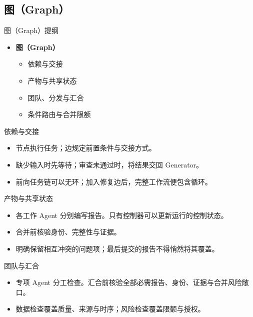 \subsection{图（Graph）}
\begin{frame}{图（Graph）提纲}
\begin{itemize}
\item \textbf{图（Graph）}
\begin{itemize}
\item 依赖与交接
\item 产物与共享状态
\item 团队、分发与汇合
\item 条件路由与合并限额
\end{itemize}
\end{itemize}
\end{frame}
\begin{frame}{依赖与交接}
\begin{center}
\resizebox{.94\textwidth}{!}{}
\end{center}
\begin{itemize}
\item 节点执行任务；边规定前置条件与交接方式。
\item 缺少输入时先等待；审查未通过时，将结果交回 Generator。
\item 前向任务链可以无环；加入修复边后，完整工作流便包含循环。
\end{itemize}
\end{frame}
\begin{frame}{产物与共享状态}
\begin{center}
\resizebox{.96\textwidth}{!}{}
\end{center}
\begin{itemize}
\item 各工作 Agent 分别编写报告。只有控制器可以更新运行的控制状态。
\item 合并前核验身份、完整性与证据。
\item 明确保留相互冲突的问题项；最后提交的报告不得悄然将其覆盖。
\end{itemize}
\end{frame}
\begin{frame}{团队与汇合}
\setlength{\topsep}{0pt}
\begin{center}
\resizebox{.86\textwidth}{!}{}
\end{center}
\begin{itemize}
\item 专项 Agent 分工检查。汇合前核验全部必需报告、身份、证据与合并风险敞口。
\item 数据检查覆盖质量、来源与时序；风险检查覆盖限额与授权。
\end{itemize}
\end{frame}
